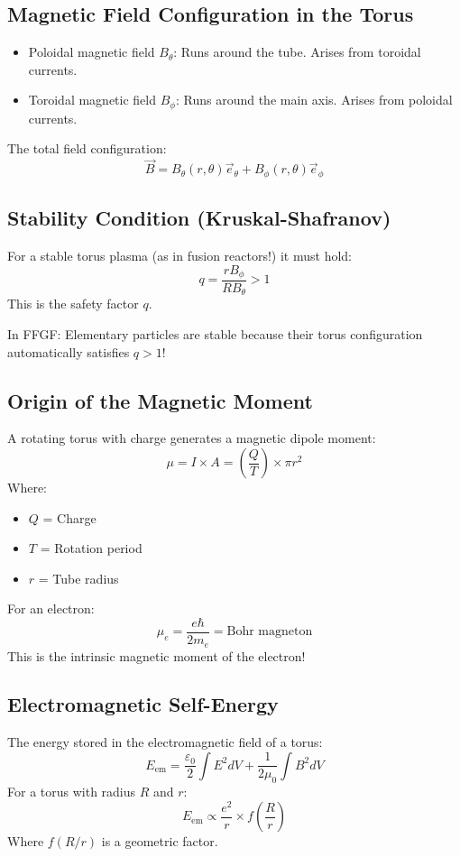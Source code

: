 \documentclass[12pt,a4paper]{article}
\begin{document}
\subsection{Magnetic Field Configuration in the Torus}
\begin{itemize}
	\item Poloidal magnetic field \( B_\theta \):
	Runs around the tube. Arises from toroidal currents.
	\item Toroidal magnetic field \( B_\phi \):
	Runs around the main axis. Arises from poloidal currents.
\end{itemize}

The total field configuration:
\[
\vec{B} = B_\theta(r, \theta) \vec{e}_\theta + B_\phi(r, \theta) \vec{e}_\phi
\]

\subsection{Stability Condition (Kruskal-Shafranov)}
For a stable torus plasma (as in fusion reactors!) it must hold:
\[
q = \frac{r B_\phi}{R B_\theta} > 1
\]
This is the safety factor \( q \).

In FFGF: Elementary particles are stable because their torus configuration automatically satisfies \( q > 1 \)!

\subsection{Origin of the Magnetic Moment}
A rotating torus with charge generates a magnetic dipole moment:
\[
\mu = I \times A = \left(\frac{Q}{T}\right) \times \pi r^2
\]
Where:
\begin{itemize}
	\item \( Q \) = Charge
	\item \( T \) = Rotation period
	\item \( r \) = Tube radius
\end{itemize}

For an electron:
\[
\mu_e = \frac{e \hbar}{2 m_e} = \text{Bohr magneton}
\]
This is the intrinsic magnetic moment of the electron!

\subsection{Electromagnetic Self-Energy}
The energy stored in the electromagnetic field of a torus:
\[
E_{\text{em}} = \frac{\varepsilon_0}{2} \int E^2 dV + \frac{1}{2\mu_0} \int B^2 dV
\]
For a torus with radius \( R \) and \( r \):
\[
E_{\text{em}} \propto \frac{e^2}{r} \times f\left(\frac{R}{r}\right)
\]
Where \( f(R/r) \) is a geometric factor.
\end{document}

